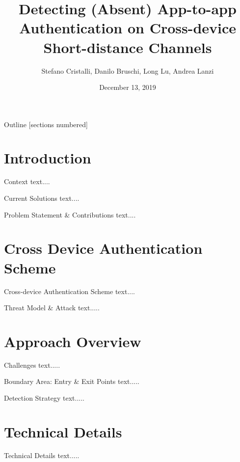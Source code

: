 \documentclass[10pt]{beamer}
\title{Detecting (Absent) App-to-app Authentication on Cross-device
Short-distance Channels}
\date{December 13, 2019}
\author{Stefano Cristalli, Danilo Bruschi, Long Lu, Andrea Lanzi}
\institute{University of Milan Italy Northeastern University Boston US}
\begin{document}
\maketitle 

\begin{frame}{Outline}
  [sections numbered]
  \tableofcontents[hideallsubsections]
\end{frame}

\section{Introduction}
\begin{frame}[fragile]{Context}
text....
\end{frame}

\begin{frame}[fragile]{Current Solutions}
text....
\end{frame}

\begin{frame}[fragile]{Problem Statement \& Contributions}
text....
\end{frame}


\section{Cross Device Authentication Scheme}
\begin{frame}[fragile]{Cross-device Authentication Scheme}
text....		  
\end{frame}

\begin{frame}[fragile]{Threat Model \& Attack}
text.....	  
\end{frame}

\section{Approach Overview}
\begin{frame}[fragile]{Challenges}
text.....		
\end{frame}

\begin{frame}[fragile]{Boundary Area: Entry \& Exit Points}
text.....		
\end{frame}

\begin{frame}[fragile]{Detection Strategy}
text.....		
\end{frame}

\section{Technical Details}
\begin{frame}[fragile]{Technical Details}
text.....		
\end{frame}
\end{document}
